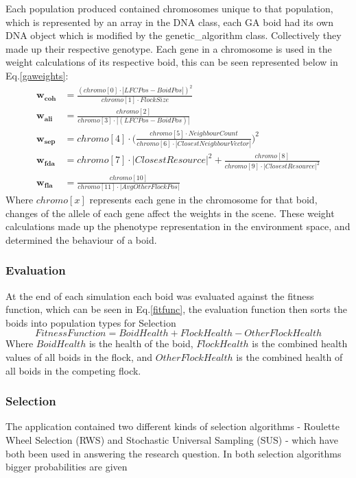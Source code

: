 Each population produced contained chromosomes unique to that population, which is represented by an array in the DNA class, each GA boid had its own DNA object which is modified by the genetic\_algorithm class. Collectively they made up their respective genotype. Each gene in a chromosome is used in the weight calculations of its respective boid, this can be seen represented below in Eq.\ref{gaweights}:
\begin{equation}
	\begin{split}
		\boldsymbol{w_{coh}} &= \frac{(chromo[0] \cdot |LFCPos - BoidPos|)^2} {chromo[1] \cdot FlockSize} \\
		\boldsymbol{w_{ali}} &= \frac{chromo[2]} {chromo[3] \cdot |(LFCPos - BoidPos)|} \\
		\boldsymbol{w_{sep}} &= chromo[4] \cdot  \Big(\frac{chromo[5] \cdot NeighbourCount} {chromo[6] \cdot |ClosestNeighbourVector|}\Big)^2 \\
		\boldsymbol{w_{fda}} &= chromo[7] \cdot |ClosestResource|^2 + \frac{chromo[8]} {chromo[9] \cdot |ClosestResource|^2} \\
		\boldsymbol{w_{fla}} &= \frac{chromo[10]} {chromo[11] \cdot |AvgOtherFlockPos|} 
	\end{split}
	\label{gaweights}
\end{equation}
Where $chromo[x]$ represents each gene in the chromosome for that boid, changes of the allele of each gene affect the weights in the scene.
These weight calculations made up the phenotype representation in the environment space, and determined the behaviour of a boid. 

\subsubsection{Evaluation}
At the end of each simulation each boid was evaluated against the fitness function, which can be seen in Eq.\ref{fitfunc}, the evaluation function then sorts the boids into population types for Selection
\begin{equation}
	Fitness Function = BoidHealth + FlockHealth - OtherFlockHealth
	\label{fitfunc}
\end{equation}
Where $BoidHealth$ is the health of the boid, $FlockHealth$ is the combined health values of all boids in the flock, and $OtherFlockHealth$ is the combined health of all boids in the competing flock.


\subsubsection{Selection}
The application contained two different kinds of selection algorithms - Roulette Wheel Selection (RWS) and Stochastic Universal Sampling (SUS) - which have both been used in answering the research question. In both selection algorithms bigger probabilities are given 




